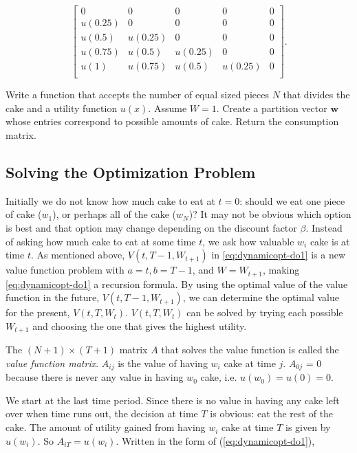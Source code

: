 \[
\begin{bmatrix}
0 & 0 & 0 & 0 & 0 \\
u(0.25) & 0 & 0 & 0 & 0 \\
u(0.5) & u(0.25) & 0 & 0 & 0 \\
u(0.75) & u(0.5) & u(0.25) & 0 & 0 \\
u(1) & u(0.75) & u(0.5) & u(0.25) & 0 \\
\end{bmatrix}.
\]

\begin{problem}

Write a function that accepts the number of equal sized pieces $N$ that divides the cake and a utility function $u(x)$.
Assume $W=1$.
Create a partition vector $\mathbf{w}$ whose entries correspond to possible amounts of cake.
Return the consumption matrix.

\end{problem}


\subsection*{Solving the Optimization Problem}

Initially we do not know how much cake to eat at $t = 0$: should we eat one piece of cake ($w_1$), or perhaps all of the cake ($w_N$)?
It may not be obvious which option is best and that option may change depending on the discount factor $\beta$.
Instead of asking how much cake to eat at some time $t$, we ask how valuable $w_i$ cake is at time $t$.
As mentioned above, $V(t, T-1, W_{t+1})$ in \ref{eq:dynamicopt-do1} is a new value function problem with $a = t, b = T-1$, and $W = W_{t+1}$, making \ref{eq:dynamicopt-do1} a recursion formula.
By using the optimal value of the value function in the future, $V(t, T-1, W_{t+1})$, we can determine the optimal value for the present, $V(t, T, W_{t})$.
$V(t, T, W_{t})$ can be solved by trying each possible $W_{t+1}$ and choosing the one that gives the highest utility.


The $(N+1) \times (T+1)$ matrix $A$ that solves the value function is called the \emph{value function matrix}.
$A_{ij}$ is the value of having $w_i$ cake at time $j$.
$A_{0j}$ = 0 because there is never any value in having $w_0$ cake, i.e. $u(w_0) = u(0) = 0$.

We start at the last time period.
Since there is no value in having any cake left over when time runs out, the decision at time $T$ is obvious: eat the rest of the cake.
The amount of utility gained from having $w_i$ cake at time $T$ is given by $u(w_i)$.
So $A_{iT} = u(w_i)$.
Written in the form of (\ref{eq:dynamicopt-do1}),


